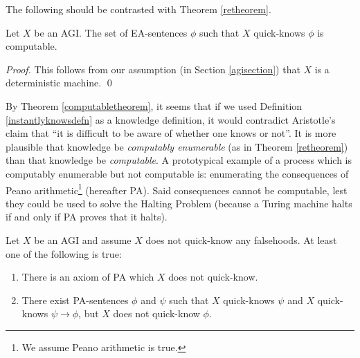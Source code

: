 \documentclass[runningheads]{llncs}
\begin{document}
The following should be contrasted with Theorem \ref{retheorem}.

\begin{theorem}
\label{computabletheorem}
  Let $X$ be an AGI.
  The set of EA-sentences $\phi$ such that $X$ quick-knows $\phi$ is computable.
\end{theorem}

\begin{proof}
  This follows from our assumption (in Section \ref{agisection}) that
  $X$ is a deterministic machine.
  \qed
\end{proof}

By Theorem \ref{computabletheorem}, it seems that if we used
Definition \ref{instantlyknowsdefn} as a knowledge definition, it would
contradict Aristotle's claim that
``it is difficult to be aware of whether one
knows or not''. It is more plausible that knowledge be \emph{computably enumerable}
(as in Theorem \ref{retheorem}) than that knowledge be \emph{computable}.
A prototypical example of a process which is computably enumerable but not computable
is: enumerating the consequences of Peano arithmetic\footnote{We assume Peano
arithmetic is true.} (hereafter PA).
Said consequences cannot be computable, lest they could be used to solve the Halting
Problem (because a Turing machine halts if and only if PA proves that it halts).

\begin{theorem}
\label{badnesstheorem}
Let $X$ be an AGI and assume $X$ does not quick-know any falsehoods.
At least one of the following is true:
\begin{enumerate}
  \item There is an axiom of PA which $X$ does not quick-know.
  \item There exist PA-sentences $\phi$ and $\psi$
  such that $X$ quick-knows $\psi$ and $X$ quick-knows $\psi\rightarrow\phi$,
  but $X$ does not quick-know $\phi$.
\end{enumerate}
\end{theorem}
\end{document}
